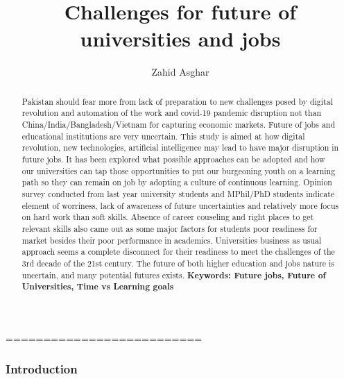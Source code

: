\documentclass[]{elsarticle} %
\begin{document}
\begin{frontmatter}

  \title{Challenges for future of universities and jobs}
    \author[Quaid-i-Azam University, Islamabad]{Zahid Asghar}
      \address[Quaid-i-Azam University]{School of Economics}
    
  \begin{abstract}
  Pakistan should fear more from lack of preparation to new challenges
  posed by digital revolution and automation of the work and covid-19
  pandemic disruption not than China/India/Bangladesh/Vietnam for
  capturing economic markets. Future of jobs and educational
  institutions are very uncertain. This study is aimed at how digital
  revolution, new technologies, artificial intelligence may lead to have
  major disruption in future jobs. It has been explored what possible
  approaches can be adopted and how our universities can tap those
  opportunities to put our burgeoning youth on a learning path so they
  can remain on job by adopting a culture of continuous learning.
  Opinion survey conducted from last year university students and
  MPhil/PhD students indicate element of worriness, lack of awareness of
  future uncertainties and relatively more focus on hard work than soft
  skills. Absence of career couseling and right places to get relevant
  skills also came out as some major factors for students poor readiness
  for market besides their poor performance in academics. Universities
  business as usual approach seems a complete disconnect for their
  readiness to meet the challenges of the 3rd decade of the 21st
  century. The future of both higher education and jobs nature is
  uncertain, and many potential futures exists. \textbf{Keywords: Future
  jobs, Future of Universities, Time vs Learning goals}
  \end{abstract}
  
 \end{frontmatter}

==========================

\hypertarget{introduction}{%
\subsubsection{Introduction}\label{introduction}}
\end{document}
